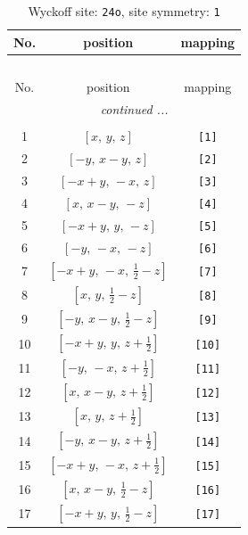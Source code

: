 \documentclass[fleqn,8pt]{jsarticle}
\begin{document}
\begin{longtable}{ccc}
\caption{Wyckoff site: {\tt 24o}, site symmetry: {\tt 1}}
 \\
 \hline \hline
No. & position & mapping \\ \hline \endfirsthead

\multicolumn{2}{l}{\tablename\ \thetable{}} \\
 \hline \hline
No. & position & mapping \\ \hline \endhead

 \hline \hline
\multicolumn{2}{r}{\footnotesize\it continued ...} \\ \endfoot

 \hline \hline
\multicolumn{2}{r}{} \\ \endlastfoot

1 & $\left[ x,\, y,\, z \right]$ & {\tt [1]} \\ \hline
2 & $\left[ - y,\, x - y,\, z \right]$ & {\tt [2]} \\ \hline
3 & $\left[ - x + y,\, - x,\, z \right]$ & {\tt [3]} \\ \hline
4 & $\left[ x,\, x - y,\, - z \right]$ & {\tt [4]} \\ \hline
5 & $\left[ - x + y,\, y,\, - z \right]$ & {\tt [5]} \\ \hline
6 & $\left[ - y,\, - x,\, - z \right]$ & {\tt [6]} \\ \hline
7 & $\left[ - x + y,\, - x,\, \frac{1}{2} - z \right]$ & {\tt [7]} \\ \hline
8 & $\left[ x,\, y,\, \frac{1}{2} - z \right]$ & {\tt [8]} \\ \hline
9 & $\left[ - y,\, x - y,\, \frac{1}{2} - z \right]$ & {\tt [9]} \\ \hline
10 & $\left[ - x + y,\, y,\, z + \frac{1}{2} \right]$ & {\tt [10]} \\ \hline
11 & $\left[ - y,\, - x,\, z + \frac{1}{2} \right]$ & {\tt [11]} \\ \hline
12 & $\left[ x,\, x - y,\, z + \frac{1}{2} \right]$ & {\tt [12]} \\ \hline
13 & $\left[ x,\, y,\, z + \frac{1}{2} \right]$ & {\tt [13]} \\ \hline
14 & $\left[ - y,\, x - y,\, z + \frac{1}{2} \right]$ & {\tt [14]} \\ \hline
15 & $\left[ - x + y,\, - x,\, z + \frac{1}{2} \right]$ & {\tt [15]} \\ \hline
16 & $\left[ x,\, x - y,\, \frac{1}{2} - z \right]$ & {\tt [16]} \\ \hline
17 & $\left[ - x + y,\, y,\, \frac{1}{2} - z \right]$ & {\tt [17]} \\ \hline

\end{longtable}
\end{document}
